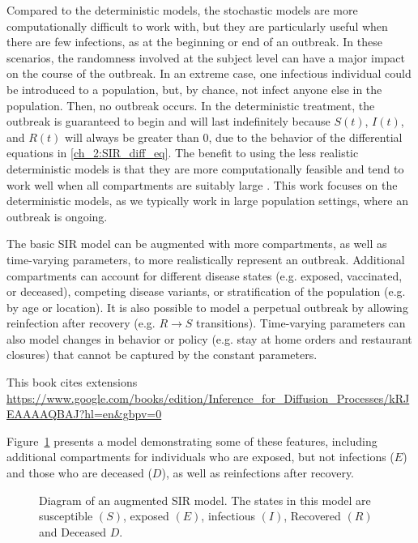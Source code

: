 Compared to the deterministic models, the stochastic models are more computationally difficult to work with, but they are particularly useful when there are few infections, as at the beginning or end of an outbreak.
In these scenarios, the randomness involved at the subject level can have a major impact on the course of the outbreak.
In an extreme case, one infectious individual could be introduced to a population, but, by chance, not infect anyone else in the population.
Then, no outbreak occurs.
In the deterministic treatment, the outbreak is guaranteed to begin and will last indefinitely because \( S(t) \), \(  I(t) \), and \( R(t) \) will always be greater than 0, due to the behavior of the differential equations in \eqref{ch_2:SIR_diff_eq}.
The benefit to using the less realistic deterministic models is that they are more computationally feasible and tend to work well when all compartments are suitably large \citep{doi:10.1098/rspb.2015.0347}.
This work focuses on the deterministic models, as we typically work in large population settings, where an outbreak is ongoing.

The basic SIR model can be augmented with more compartments, as well as time-varying parameters, to more realistically represent an outbreak.
Additional compartments can account for different disease states (e.g. exposed, vaccinated, or deceased), competing disease variants, or stratification of the population (e.g. by age or location).
It is also possible to model a perpetual outbreak by allowing reinfection after recovery (e.g. \(R \to S\) transitions).
Time-varying parameters can also model changes in behavior or policy (e.g. stay at home orders and restaurant closures) that cannot be captured by the constant parameters.

This book cites extensions
\url{https://www.google.com/books/edition/Inference_for_Diffusion_Processes/kRJEAAAAQBAJ?hl=en&gbpv=0}

Figure~\ref{ch_2:fig:SEIRDS_diagram} presents a model demonstrating some of these features, including additional compartments for individuals who are exposed, but not infections (\( E \)) and those who are deceased (\( D \)), as well as reinfections after recovery.

\begin{figure}
    \centering
    \caption{Diagram of an augmented SIR model.
    The states in this model are susceptible \( (S) \), exposed \( (E) \), infectious \( (I) \), Recovered \( (R) \) and Deceased \( D \).}
    \label{ch_2:fig:SEIRDS_diagram}
\end{figure}

